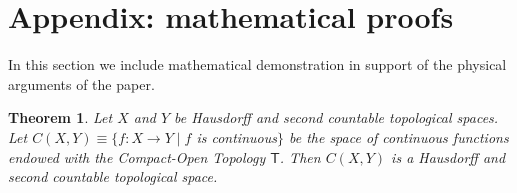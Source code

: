 \documentclass[aps,pra,10pt,twocolumn,floatfix,nofootinbib]{revtex4-1}
\numberwithin{equation}{section}
\newtheorem{thrm}[equation]{Theorem}
\theoremstyle{definition}
\begin{document}

\section{Appendix: mathematical proofs}

In this section we include mathematical demonstration in support of the physical arguments of the paper.

\begin{thrm}\label{thrm:function_topology}
	Let $X$ and $Y$ be Hausdorff and second countable topological spaces. Let $C(X, Y) \equiv \{f: X \rightarrow Y \; | \; f$ is continuous$\}$ be the space of continuous functions endowed with the Compact-Open Topology $\mathsf{T}$. Then $C(X, Y)$ is a Hausdorff and second countable topological space.
\end{thrm}
\end{document}
